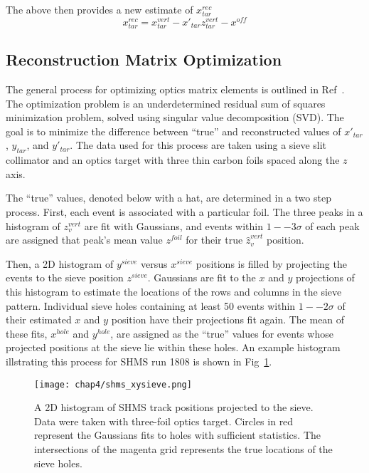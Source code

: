 The above then provides a new estimate of $x^{rec}_{tar}$
\begin{equation}
    x^{rec}_{tar} = x^{vert}_{tar} - x'_{tar}z^{vert}_{tar} - x^{off}
\end{equation}

\subsection{Reconstruction Matrix Optimization}
The general process for optimizing optics matrix elements is outlined in
Ref~\cite{Bericic_2017}.
The optimization problem is an underdetermined residual sum of squares
minimization problem, solved using singular value decomposition (SVD).
The goal is to minimize the difference between ``true'' and reconstructed
values of $x'_{tar}$, $y_{tar}$, and $y'_{tar}$.
The data used for this process are taken using a sieve slit collimator and
an optics target with three thin carbon foils spaced along the $z$ axis.


The ``true'' values, denoted below with a hat, are determined in a two step
process.
First, each event is associated with a particular foil.
The three peaks in a histogram of $z^{vert}_v$ are fit with Gaussians, and
events within $1--3\sigma$ of each peak are assigned that peak's mean
value $z^{foil}$ for their true $\hat{z}^{vert}_v$ position.


Then, a 2D histogram of $y^{sieve}$ versus $x^{sieve}$ positions is filled by
projecting the events to the sieve position $z^{sieve}$.
Gaussians are fit to the $x$ and $y$ projections of this histogram to estimate
the locations of the rows and columns in the sieve pattern.
Individual sieve holes containing at least 50 events within $1--2\sigma$ of
their estimated $x$ and $y$ position have their projections fit again.
The mean of these fits, $x^{hole}$ and $y^{hole}$, are assigned as the ``true''
values for events whose projected positions at the sieve lie within these
holes.
An example histogram illstrating this process for SHMS run 1808 is shown in
Fig~\ref{fig:shms_xysieve}.

\begin{figure}[!h]
    \centering
    \texttt{[image: chap4/shms\_xysieve.png]}
    \caption[A 2D histogram of SHMS track positions projected to the sieve.]{
            A 2D histogram of SHMS track positions projected to the sieve.
            Data were taken with three-foil optics target.
            Circles in red represent the Gaussians fits to holes with
            sufficient statistics.
            The intersections of the magenta grid represents the true locations
            of the sieve holes.
            }
    \label{fig:shms_xysieve}
\end{figure}


